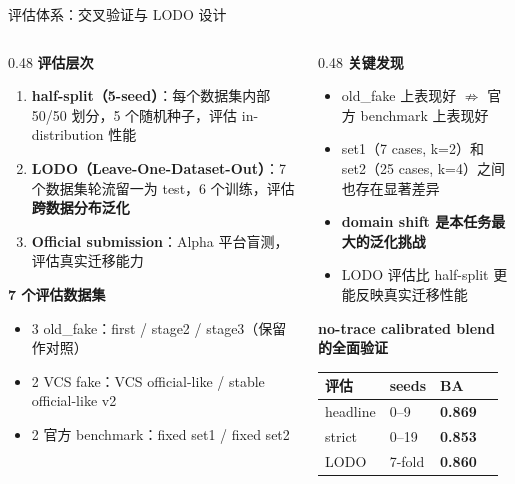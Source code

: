 \documentclass[aspectratio=169,UTF8]{ctexbeamer}
\newcommand{\key}[1]{\textcolor{ICCADBlue}{\textbf{#1}}}
\newcommand{\good}[1]{\textcolor{ICCADGreen}{\textbf{#1}}}
\begin{document}
\begin{frame}{评估体系：交叉验证与 LODO 设计}
  \small
  \begin{columns}[T]
    \begin{column}{0.48\textwidth}
      \textbf{评估层次}
      \begin{enumerate}
        \item \textbf{half-split（5-seed）}：每个数据集内部 50/50 划分，5 个随机种子，评估 in-distribution 性能
        \item \textbf{LODO（Leave-One-Dataset-Out）}：7 个数据集轮流留一为 test，6 个训练，评估\key{跨数据分布泛化}
        \item \textbf{Official submission}：Alpha 平台盲测，评估真实迁移能力
      \end{enumerate}
      \vspace{2mm}
      \textbf{7 个评估数据集}
      \begin{itemize}
        \item 3 old\_fake：first / stage2 / stage3（保留作对照）
        \item 2 VCS fake：VCS official-like / stable official-like v2
        \item 2 官方 benchmark：fixed set1 / fixed set2
      \end{itemize}
    \end{column}
    \begin{column}{0.48\textwidth}
      \textbf{关键发现}
      \begin{itemize}
        \item old\_fake 上表现好 $\not\Rightarrow$ 官方 benchmark 上表现好
        \item set1（7 cases, k=2）和 set2（25 cases, k=4）之间也存在显著差异
        \item \textbf{domain shift 是本任务最大的泛化挑战}
        \item LODO 评估比 half-split 更能反映真实迁移性能
      \end{itemize}
      \vspace{2mm}
      \textbf{no-trace calibrated blend 的全面验证}
      \begin{tabularx}{\linewidth}{p{2.4cm}p{1.5cm}p{1.5cm}p{1.5cm}}
        \toprule
        \textbf{评估} & \textbf{seeds} & \textbf{BA} \\
        \midrule
        headline & 0--9 & \good{0.869} \\
        strict & 0--19 & \good{0.853} \\
        LODO & 7-fold & \good{0.860} \\
        \bottomrule
      \end{tabularx}
    \end{column}
  \end{columns}
\end{frame}
\end{document}
